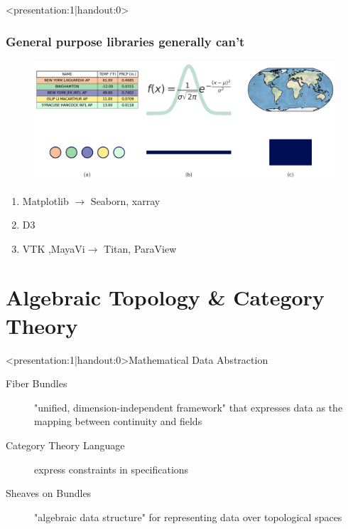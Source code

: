 \documentclass[xcolor={dvipsnames}, handout]{beamer}
\begin{document}
\begin{frame}<presentation:1|handout:0>
    \frametitle{General purpose libraries generally can't\cite{toryRethinkingVisualizationHighlevel2004}}
    \begin{figure}
        \includegraphics[height=.3\textheight]{../paper/figures/k_different_types.png}
    \end{figure}

    \begin{enumerate}
        \item Matplotlib\cite{hunterMatplotlib2DGraphics2007} $\rightarrow$ Seaborn\cite{waskom2020seaborn}, xarray \cite{hoyer2017xarray} 
        \item D3 \cite{bostockDataDrivenDocuments2011}
        \item VTK \cite{hanwellVisualizationToolkitVTK2015,geveciVTK2012},MayaVi\cite{RamachandranMayaVI2011}$\rightarrow$ Titan\cite{brianwylieUnifiedToolkitInformation2009}, ParaView\cite{ahrens2005paraview}
    \end{enumerate}
\end{frame}

\section{Algebraic Topology & Category Theory}
\begin{frame}<presentation:1|handout:0>{Mathematical Data Abstraction}
    \begin{description}
        \item[Fiber Bundles] "unified, dimension-independent framework" that expresses data as the mapping between continuity and fields \cite{butlerVectorBundleClassesForm1992,butlerVisualizationModelBased1989}
        \item[Category Theory Language] express constraints in specifications \cite{wielsManagementEvolvingSpecifications1998}   
        \item[Sheaves on Bundles] "algebraic data structure" for representing data over topological spaces \cite{ghristElementaryAppliedTopology2014}
    \end{description}
\end{frame}
\end{document}
